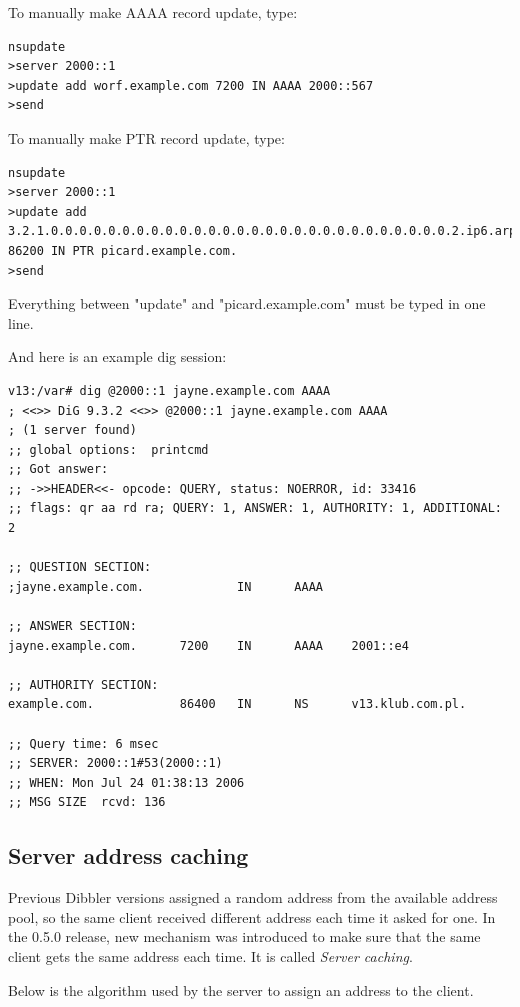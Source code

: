 
To manually make AAAA record update, type:
\begin{lstlisting}
nsupdate
>server 2000::1
>update add worf.example.com 7200 IN AAAA 2000::567
>send
\end{lstlisting}

To manually make PTR record update, type:
\begin{lstlisting}
nsupdate
>server 2000::1
>update add 
3.2.1.0.0.0.0.0.0.0.0.0.0.0.0.0.0.0.0.0.0.0.0.0.0.0.0.0.0.0.0.2.ip6.arpa.
86200 IN PTR picard.example.com. 
>send
\end{lstlisting}

\Note Everything between "update" and "picard.example.com" must be typed in one line.

And here is an example dig session:

\begin{lstlisting}
v13:/var# dig @2000::1 jayne.example.com AAAA
; <<>> DiG 9.3.2 <<>> @2000::1 jayne.example.com AAAA
; (1 server found)
;; global options:  printcmd
;; Got answer:
;; ->>HEADER<<- opcode: QUERY, status: NOERROR, id: 33416
;; flags: qr aa rd ra; QUERY: 1, ANSWER: 1, AUTHORITY: 1, ADDITIONAL: 2

;; QUESTION SECTION:
;jayne.example.com.             IN      AAAA

;; ANSWER SECTION:
jayne.example.com.      7200    IN      AAAA    2001::e4

;; AUTHORITY SECTION:
example.com.            86400   IN      NS      v13.klub.com.pl.

;; Query time: 6 msec
;; SERVER: 2000::1#53(2000::1)
;; WHEN: Mon Jul 24 01:38:13 2006
;; MSG SIZE  rcvd: 136
\end{lstlisting}

\subsection{Server address caching}
Previous Dibbler versions assigned a random address from the available
address pool, so the same client received different address each time it
asked for one. In the 0.5.0 release, new mechanism was introduced
to make sure that the same client gets the same address each time. It is
called \emph{Server caching}.

Below is the algorithm used by the server to assign an address to the client.

